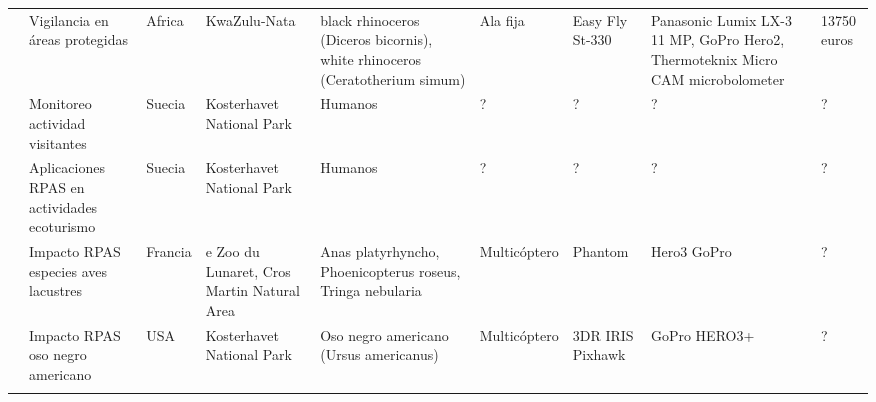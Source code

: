 \begin{landscape}
\begin{longtabu}{p{1cm}p{3cm}p{2cm}p{3cm}p{3cm}p{1cm}p{2cm}p{3cm}p{2cm}}
\cite{mulero-pazmany_remotely_2014}   & Vigilancia en áreas protegidas & Africa & KwaZulu-Nata & black rhinoceros (Diceros bicornis), white rhinoceros (Ceratotherium simum)  & Ala fija  & Easy Fly St-330 & Panasonic Lumix LX-3 11 MP, GoPro Hero2, Thermoteknix Micro CAM microbolometer & 13750 euros  \\ 

\cite{hansen_applying_2016}  & Monitoreo actividad visitantes  & Suecia & Kosterhavet National Park &  Humanos  & ?  & ? & ?   & ?  \\ 

\cite{king_will_2014}  & Aplicaciones RPAS en actividades ecoturismo & Suecia & Kosterhavet National Park &  Humanos  & ?  & ? & ?   & ?  \\ 
  
\cite{vas_approaching_2015}  & Impacto RPAS  especies aves lacustres  & Francia & e Zoo du Lunaret, Cros Martin Natural Area &  Anas platyrhyncho, Phoenicopterus roseus, Tringa nebularia  & Multicóptero &  Phantom & Hero3 GoPro  & ?  \\ 

\cite{ditmer_bears_2015}  & Impacto  RPAS oso negro americano   & USA & Kosterhavet National Park &  Oso negro americano (Ursus americanus) & Multicóptero & 3DR IRIS Pixhawk & GoPro HERO3+   & ?  \\ 

 \\

\hline


\end{longtabu}
\end{landscape}
